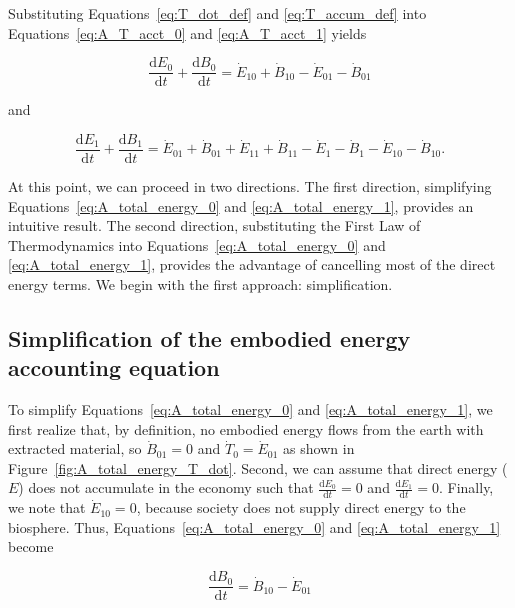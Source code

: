 Substituting Equations~\ref{eq:T_dot_def} and
\ref{eq:T_accum_def} into 
Equations~\ref{eq:A_T_acct_0} and \ref{eq:A_T_acct_1}
yields

\begin{equation} \label{eq:A_total_energy_0}
	\frac{\mathrm{d}E_{0}}{\mathrm{d}t} 
	+ \frac{\mathrm{d}B_{0}}{\mathrm{d}t} 
	= \dot{E}_{10} 
	+ \dot{B}_{10} 
	- \dot{E}_{01}
	- \dot{B}_{01}
\end{equation}

\noindent and

\begin{equation} \label{eq:A_total_energy_1}
	\frac{\mathrm{d}E_{1}}{\mathrm{d}t} 
	+ \frac{\mathrm{d}B_{1}}{\mathrm{d}t} 
	= \dot{E}_{01} 
	+ \dot{B}_{01} 
	+ \dot{E}_{11}
	+ \dot{B}_{11}
	- \dot{E}_{1}
	- \dot{B}_{1}
	- \dot{E}_{10}
	- \dot{B}_{10}.	
\end{equation}

At this point, we can proceed in two directions.
The first direction, 
simplifying Equations~\ref{eq:A_total_energy_0} and \ref{eq:A_total_energy_1}, 
provides an intuitive result. 
The second direction,
substituting the First Law of Thermodynamics into 
Equations~\ref{eq:A_total_energy_0} and \ref{eq:A_total_energy_1}, 
provides the advantage of cancelling most of the direct energy terms.
We begin with the first approach: simplification.


\subsection{Simplification of the embodied energy accounting equation} %
\label{sec:A_simplified_embodied}

To simplify Equations~\ref{eq:A_total_energy_0} and \ref{eq:A_total_energy_1},
we first realize that, by definition, no embodied energy flows from 
the earth with extracted material, so $\dot{B}_{01} = 0$
and $\dot{T}_{0} = \dot{E}_{01}$ as shown in Figure~\ref{fig:A_total_energy_T_dot}.
Second, we can assume that direct energy ($E$) does not accumulate
in the economy such that 
$\frac{\mathrm{d}E_0}{\mathrm{d}t} = 0$ and
$\frac{\mathrm{d}E_1}{\mathrm{d}t} = 0$.
Finally, we note that $\dot{E}_{10} = 0$, 
because society does not supply direct energy 
to the biosphere. Thus, Equations~\ref{eq:A_total_energy_0}
and \ref{eq:A_total_energy_1} become

\begin{equation} \label{eq:A_total_energy_0_simp}
	\frac{\mathrm{d}B_{0}}{\mathrm{d}t} 
	= \dot{B}_{10} 
	- \dot{E}_{01}
\end{equation}

